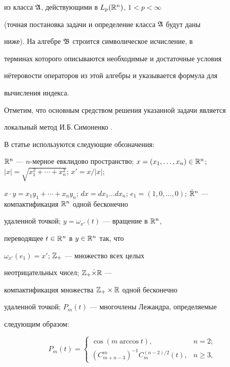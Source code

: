 из класса $\frak A$, действующими в $L_p(\Bbb R^n)$, $1<p<\infty$


(точная постановка задачи и определение класса $\frak A$ будут даны


ниже). На алгебре $\frak B$ строится символическое исчисление, в


терминах которого описываются необходимые и достаточные условия


н\"етеровости операторов из этой алгебры и указывается формула для


вычисления индекса.


Отметим, что основным средством решения указанной задачи является


локальный метод И.Б.\,Симоненко \cite{b4}.





В статье используются следующие обозначения:


$\Bbb R^n$ --- $n$-мерное евклидово пространство; $x=(x_1,\dotsc,


x_n)\in\Bbb R^n$; $|x|=\sqrt{x_1^2+\dotsb +x_n^2}$; $x'=x/|x|$;


$x\cdot y=x_1y_1+\dotsb+x_ny_n$; $dx=dx_1\dotsc dx_n$; $e_1=(1,0,\dotsc,


0)$; $\Dot{\Bbb R}^n$ --- компактификация $\Bbb R^n$ одной бесконечно


удаленной точкой; $y=\omega_{x'}(t)$ --- вращение в $\Bbb R^n$,


переводящее $t\in\Bbb R^n$ в $y\in\Bbb R^n$ так, что


$\omega_{x'}(e_1)=x'$; $\Bbb Z_+$ --- множество всех целых


неотрицательных чисел; $\Bbb Z_+\dot\times\Bbb R$ ---


компактификация множества $\Bbb Z_+\times\Bbb R$ одной бесконечно


удаленной точкой; $P_m(t)$ --- многочлены Лежандра, определяемые


следующим образом:


$$


P_m(t)=


\begin{cases}


\cos(m\arccos t), &n=2;\\


(C_{m+n-3}^m)^{-1}C_m^{(n-2)/2}(t), &n\geqslant 3,


\end{cases}


$$


